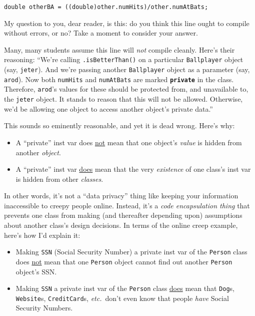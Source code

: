 \begin{verbatim}
double otherBA = ((double)other.numHits)/other.numAtBats;
\end{verbatim}

My question to you, dear reader, is this: do you think this line ought to
compile without errors, or no? Take a moment to consider your answer.

Many, many students assume this line will \textit{not} compile cleanly. Here's
their reasoning: ``We're calling \texttt{.isBetterThan()} on a particular
\texttt{Ballplayer} object (say, \texttt{jeter}). And we're passing another
\texttt{Ballplayer} object as a parameter (say, \texttt{arod}). Now both
\texttt{numHits} and \texttt{numAtBats} are marked \textbf{\texttt{private}}
in the class. Therefore, \texttt{arod}'s values for these should be protected
from, and unavailable to, the \texttt{jeter} object. It stands to reason that
this will not be allowed. Otherwise, we'd be allowing one object to access
another object's private data.''

This sounds so eminently reasonable, and yet it is dead wrong. Here's why:

\begin{itemize}
\itemsep.1em
\item[{\color{darkred} \XSolidBold}] A ``private'' inst var does \underline{not} mean that one object's
\textit{value} is hidden from another \textit{object}.
\item[{\color{darkgreen} \CheckmarkBold}] A ``private'' inst var \underline{does} mean that the very
\textit{existence} of one class's inst var is hidden from other
\textit{classes}.
\end{itemize}

In other words, it's not a ``data privacy'' thing like keeping your information
inaccessible to creepy people online. Instead, it's a \textit{code
encapsulation thing} that prevents one class from making (and thereafter
depending upon) assumptions about another class's design decisions. In terms
of the online creep example, here's how I'd explain it:

\begin{itemize}
\itemsep.1em
\item[{\color{darkred} \XSolidBold}] Making \texttt{SSN} (Social Security Number) a private inst var of the
\texttt{Person} class does \underline{not} mean that one \texttt{Person} object
cannot find out another \texttt{Person} object's SSN.
\item[{\color{darkgreen} \CheckmarkBold}] Making \texttt{SSN} a private inst var of the \texttt{Person} class
\underline{does} mean that \texttt{Dog}s, \texttt{Website}s,
\texttt{CreditCard}s, \textit{etc.}~don't even know that people \textit{have}
Social Security Numbers.
\end{itemize}

